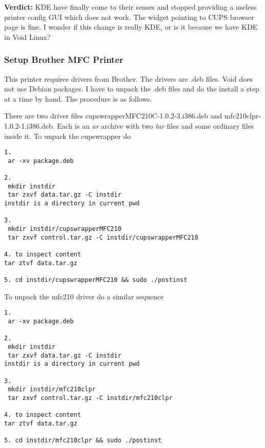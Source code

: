 \documentclass{article}  %
\begin{document}
{\bf Verdict:} KDE have finally come to their senses and stopped providing a useless printer config GUI which does not work. The widget pointing to  CUPS browser page is fine. I wonder if this change is really KDE, or is it because we have KDE in Void Linux?

\subsubsection{Setup Brother MFC Printer}
This printer requires drivers from Brother. The drivers are .deb files. Void does not use Debian packages. I have to unpack the .deb files and do the install a step at a time by hand. The procedure is as follows.

There are two driver files cupswrapperMFC210C-1.0.2-3.i386.deb and mfc210clpr-1.0.2-1.i386.deb. Each is an {\em ar} archive with two {\em tar} files  and some ordinary files inside it. To unpack the cupswrapper do
\begin{verbatim}
1.
 ar -xv package.deb

2.
 mkdir instdir
 tar zxvf data.tar.gz -C instdir
instdir is a directory in current pwd

3.
 mkdir instdir/cupswrapperMFC210
 tar zxvf control.tar.gz -C instdir/cupswrapperMFC210

4. to inspect content
tar ztvf data.tar.gz

5. cd instdir/cupswrapperMFC210 && sudo ./postinst
\end{verbatim}
To unpack the mfc210 driver do a similar sequence
\begin{verbatim}
1.
 ar -xv package.deb

2.
 mkdir instdir
 tar zxvf data.tar.gz -C instdir
instdir is a directory in current pwd

3.
 mkdir instdir/mfc210clpr
 tar zxvf control.tar.gz -C instdir/mfc210clpr

4. to inspect content
tar ztvf data.tar.gz

5. cd instdir/mfc210clpr && sudo ./postinst

\end{verbatim}
\end{document}
